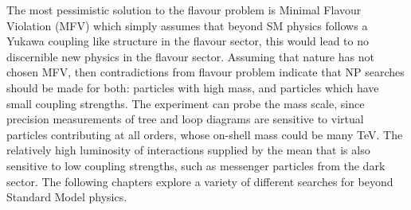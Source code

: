 The most pessimistic solution to the flavour problem is Minimal Flavour Violation (MFV)
which simply assumes that beyond SM physics follows a Yukawa coupling like structure in the flavour
sector, this would lead to no discernible new physics in the flavour sector.
Assuming that nature has not chosen MFV, then contradictions from flavour problem indicate that NP
searches should be made for both: particles
with high mass, and particles which have small coupling strengths.
The \lhcb experiment can probe the mass scale, since precision measurements of tree and loop
diagrams are sensitive to virtual particles contributing at all orders, whose on-shell mass could
be many TeV.
The relatively high luminosity of interactions supplied by the \lhc mean that \lhcb is also
sensitive to low coupling strengths, such as messenger particles from the dark sector.
The following chapters explore a variety of different searches for beyond Standard Model physics.














